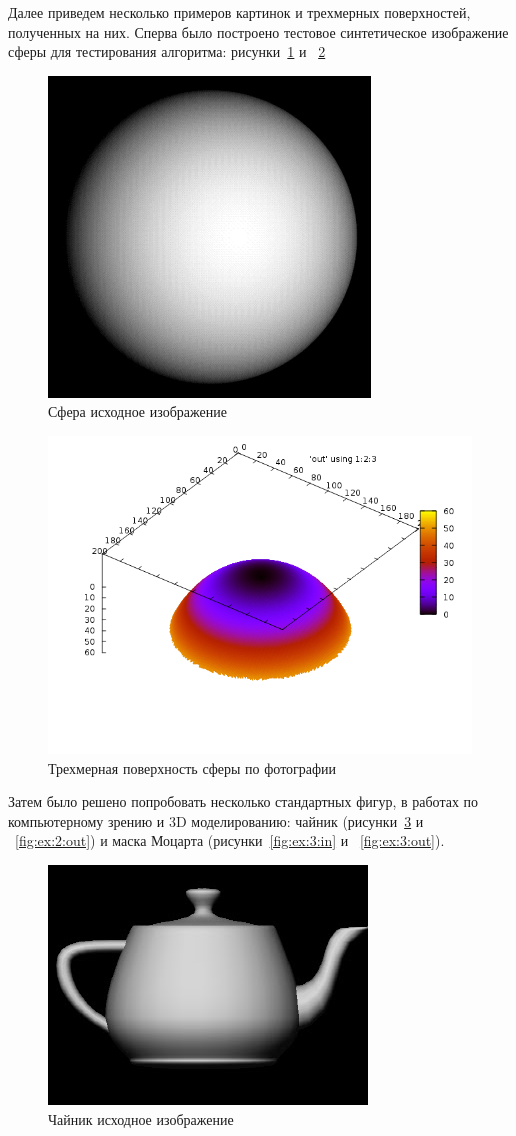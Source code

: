 Далее приведем несколько примеров картинок и трехмерных поверхностей,
полученных на них. Сперва было построено тестовое синтетическое
изображение сферы для тестирования алгоритма: рисунки~\ref{fig:ex:1:in} 
и ~\ref{fig:ex:1:out}

\begin{figure}[H]
  \centering
  \includegraphics[width=0.5\linewidth]{img/sphere_in.png}
  \hfil \caption{Сфера исходное изображение}
  \label{fig:ex:1:in}
\end{figure}

\begin{figure}[H]
  \centering
  \includegraphics[width=0.5\linewidth]{img/sphere.png}
  \hfil \caption{Трехмерная поверхность сферы по фотографии}
  \label{fig:ex:1:out}
\end{figure}

Затем было решено попробовать несколько стандартных фигур, в работах
по компьютерному зрению и 3D моделированию: чайник
(рисунки~\ref{fig:ex:2:in} и ~\ref{fig:ex:2:out}) и маска Моцарта
(рисунки~\ref{fig:ex:3:in} и ~\ref{fig:ex:3:out}).

\begin{figure}[H]
  \centering
  \includegraphics[width=0.5\linewidth]{img/teapot_in.jpg}
  \hfil \caption{Чайник исходное изображение}
  \label{fig:ex:2:in}
\end{figure}

